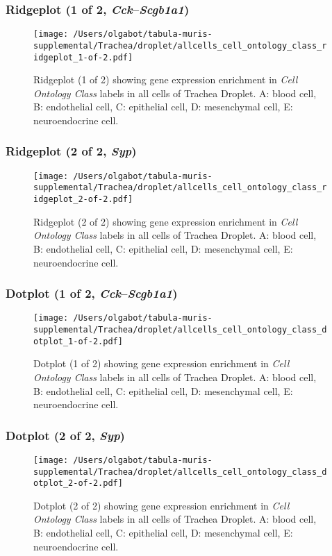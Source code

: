 \subsubsection{Ridgeplot (1 of 2, \emph{Cck}--\emph{Scgb1a1})}
\begin{figure}[h]
\centering
\texttt{[image: /Users/olgabot/tabula-muris-supplemental/Trachea/droplet/allcells\_cell\_ontology\_class\_ridgeplot\_1-of-2.pdf]}

\caption{ Ridgeplot (1 of 2)  showing gene expression enrichment in \emph{Cell Ontology Class} labels in all cells of Trachea Droplet. A: blood cell, B: endothelial cell, C: epithelial cell, D: mesenchymal cell, E: neuroendocrine cell.}
\end{figure}


\clearpage

\subsubsection{Ridgeplot (2 of 2, \emph{Syp})}
\begin{figure}[h]
\centering
\texttt{[image: /Users/olgabot/tabula-muris-supplemental/Trachea/droplet/allcells\_cell\_ontology\_class\_ridgeplot\_2-of-2.pdf]}

\caption{ Ridgeplot (2 of 2)  showing gene expression enrichment in \emph{Cell Ontology Class} labels in all cells of Trachea Droplet. A: blood cell, B: endothelial cell, C: epithelial cell, D: mesenchymal cell, E: neuroendocrine cell.}
\end{figure}


\clearpage

\subsubsection{Dotplot (1 of 2, \emph{Cck}--\emph{Scgb1a1})}
\begin{figure}[h]
\centering
\texttt{[image: /Users/olgabot/tabula-muris-supplemental/Trachea/droplet/allcells\_cell\_ontology\_class\_dotplot\_1-of-2.pdf]}

\caption{ Dotplot (1 of 2)  showing gene expression enrichment in \emph{Cell Ontology Class} labels in all cells of Trachea Droplet. A: blood cell, B: endothelial cell, C: epithelial cell, D: mesenchymal cell, E: neuroendocrine cell.}
\end{figure}


\clearpage

\subsubsection{Dotplot (2 of 2, \emph{Syp})}
\begin{figure}[h]
\centering
\texttt{[image: /Users/olgabot/tabula-muris-supplemental/Trachea/droplet/allcells\_cell\_ontology\_class\_dotplot\_2-of-2.pdf]}

\caption{ Dotplot (2 of 2)  showing gene expression enrichment in \emph{Cell Ontology Class} labels in all cells of Trachea Droplet. A: blood cell, B: endothelial cell, C: epithelial cell, D: mesenchymal cell, E: neuroendocrine cell.}
\end{figure}


